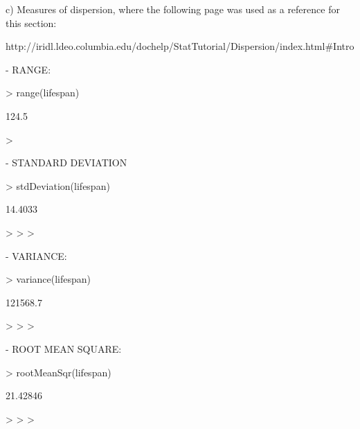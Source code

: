 \documentclass[a4paper]{article}
\begin{document}
c) Measures of dispersion, where the following page was used as a reference for this section:



http://iridl.ldeo.columbia.edu/dochelp/StatTutorial/Dispersion/index.html#Intro







- RANGE:



\begin{Schunk}
\begin{Sinput}
> range(lifespan)
\end{Sinput}
\begin{Soutput}
[1] 124.5
\end{Soutput}
\begin{Sinput}
> 
\end{Sinput}
\end{Schunk}



- STANDARD DEVIATION



\begin{Schunk}
\begin{Sinput}
> stdDeviation(lifespan)
\end{Sinput}
\begin{Soutput}
[1] 14.4033
\end{Soutput}
\begin{Sinput}
> 
> 
> 
\end{Sinput}
\end{Schunk}



- VARIANCE:



\begin{Schunk}
\begin{Sinput}
> variance(lifespan)
\end{Sinput}
\begin{Soutput}
[1] 121568.7
\end{Soutput}
\begin{Sinput}
> 
> 
> 
\end{Sinput}
\end{Schunk}



- ROOT MEAN SQUARE:



\begin{Schunk}
\begin{Sinput}
> rootMeanSqr(lifespan)
\end{Sinput}
\begin{Soutput}
[1] 21.42846
\end{Soutput}
\begin{Sinput}
> 
> 
> 
\end{Sinput}
\end{Schunk}
\end{document}
